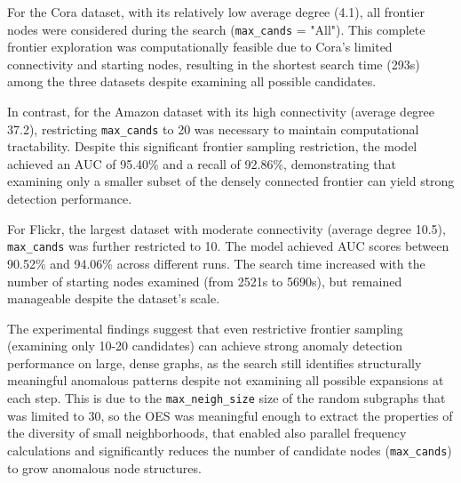 \documentclass[pdflatex,sn-mathphys-num]{sn-jnl}%
\theoremstyle{thmstyleone}%
\theoremstyle{thmstyletwo}%
\theoremstyle{thmstylethree}%
\begin{document}
For the Cora dataset, with its relatively low average degree (4.1), all frontier nodes were considered during the search (\texttt{max\_cands} = "All"). This complete frontier exploration was computationally feasible due to Cora's limited connectivity and starting nodes, resulting in the shortest search time (293s) among the three datasets despite examining all possible candidates.

In contrast, for the Amazon dataset with its high connectivity (average degree 37.2), restricting \texttt{max\_cands} to 20 was necessary to maintain computational tractability. Despite this significant frontier sampling restriction, the model achieved an AUC of 95.40\% and a recall of 92.86\%, demonstrating that examining only a smaller subset of the densely connected frontier can yield strong detection performance.

For Flickr, the largest dataset with moderate connectivity (average degree 10.5), \texttt{max\_cands} was further restricted to 10. The model achieved AUC scores between 90.52\% and 94.06\% across different runs. The search time increased with the number of starting nodes examined (from 2521s to 5690s), but remained manageable despite the dataset's scale.

The experimental findings suggest that even restrictive frontier sampling (examining only 10-20 candidates) can achieve strong anomaly detection performance on large, dense graphs, as the search still identifies structurally meaningful anomalous patterns despite not examining all possible expansions at each step. This is due to the \texttt{max\_neigh\_size} size of the random subgraphs that was limited to 30, so the OES was meaningful enough to extract the properties of the diversity of small neighborhoods, that enabled also parallel frequency calculations and significantly reduces the number of candidate nodes (\texttt{max\_cands}) to grow anomalous node structures.
\end{document}
